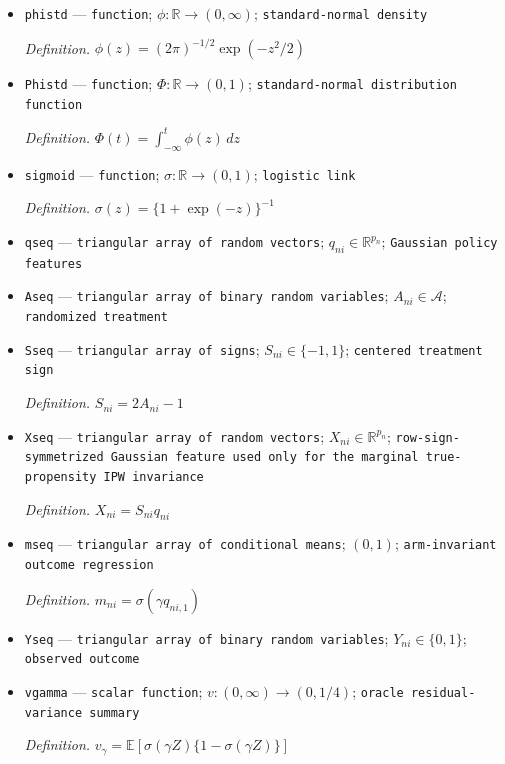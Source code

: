 \documentclass{article}
\begin{document}
\begin{itemize}
  \item \texttt{phistd} --- \texttt{function}; \(\phi:\mathbb R\to(0,\infty)\); \texttt{standard-\allowbreak{}normal density}
  \par\smallskip\noindent\emph{Definition.} \(\phi(z)=(2\pi)^{-1/2}\exp(-z^2/2)\)
  \item \texttt{Phistd} --- \texttt{function}; \(\Phi:\mathbb R\to(0,1)\); \texttt{standard-\allowbreak{}normal distribution function}
  \par\smallskip\noindent\emph{Definition.} \(\Phi(t)=\int_{-\infty}^{t}\phi(z)\,dz\)
  \item \texttt{sigmoid} --- \texttt{function}; \(\sigma:\mathbb R\to(0,1)\); \texttt{logistic link}
  \par\smallskip\noindent\emph{Definition.} \(\sigma(z)=\{1+\exp(-z)\}^{-1}\)
  \item \texttt{qseq} --- \texttt{triangular array of random vectors}; \(q_{ni}\in\mathbb R^{p_n}\); \texttt{Gaussian policy features}
  \item \texttt{Aseq} --- \texttt{triangular array of binary random variables}; \(A_{ni}\in\mathcal A\); \texttt{randomized treatment}
  \item \texttt{Sseq} --- \texttt{triangular array of signs}; \(S_{ni}\in\{-1,1\}\); \texttt{centered treatment sign}
  \par\smallskip\noindent\emph{Definition.} \(S_{ni}=2A_{ni}-1\)
  \item \texttt{Xseq} --- \texttt{triangular array of random vectors}; \(X_{ni}\in\mathbb R^{p_n}\); \texttt{row-\allowbreak{}sign-\allowbreak{}symmetrized Gaussian feature used only for the marginal true-\allowbreak{}propensity IPW invariance}
  \par\smallskip\noindent\emph{Definition.} \(X_{ni}=S_{ni}q_{ni}\)
  \item \texttt{mseq} --- \texttt{triangular array of conditional means}; \((0,1)\); \texttt{arm-\allowbreak{}invariant outcome regression}
  \par\smallskip\noindent\emph{Definition.} \(m_{ni}=\sigma(\gamma q_{ni,1})\)
  \item \texttt{Yseq} --- \texttt{triangular array of binary random variables}; \(Y_{ni}\in\{0,1\}\); \texttt{observed outcome}
  \item \texttt{vgamma} --- \texttt{scalar function}; \(v:(0,\infty)\to(0,1/4)\); \texttt{oracle residual-\allowbreak{}variance summary}
  \par\smallskip\noindent\emph{Definition.} \(v_\gamma=\mathbb E[\sigma(\gamma Z)\{1-\sigma(\gamma Z)\}]\)

\end{itemize}
\end{document}
